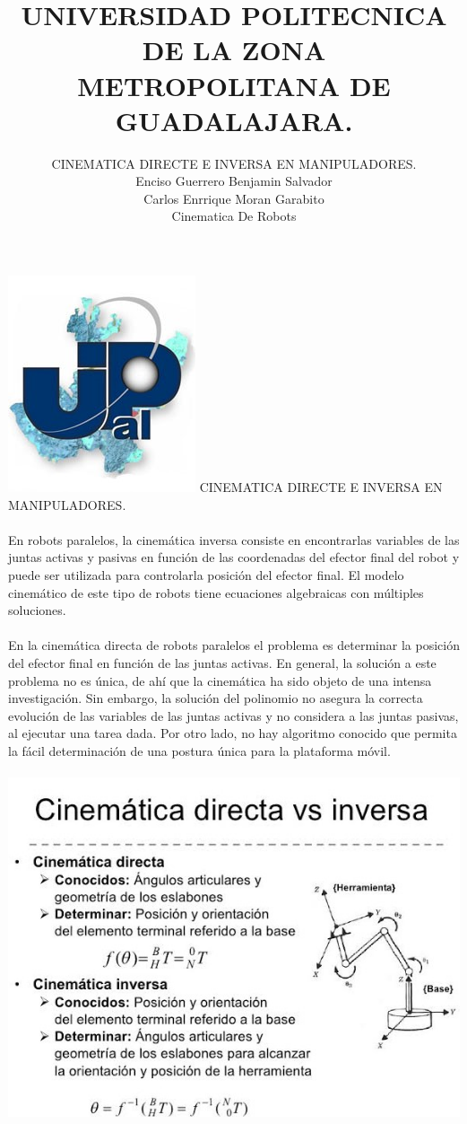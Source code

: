 \documentclass[12pt,a4paper]{article}
\author{CINEMATICA DIRECTE E INVERSA EN MANIPULADORES.\\Enciso Guerrero Benjamin Salvador\\
Carlos Enrrique Moran Garabito\\
Cinematica De Robots }
\title{UNIVERSIDAD POLITECNICA DE LA ZONA METROPOLITANA DE GUADALAJARA.}
\begin{document}
\maketitle
\includegraphics[scale=1.8]{upzmgg.jpg} 
\newpage
CINEMATICA DIRECTE E INVERSA EN MANIPULADORES.
\\\\
En robots paralelos, la cinemática inversa consiste en encontrarlas variables de las juntas activas y pasivas en función de las coordenadas del efector final del robot y puede ser utilizada para controlarla posición del efector final. El modelo cinemático de este tipo de robots tiene ecuaciones algebraicas con múltiples soluciones.
\\\\
En la cinemática directa de robots paralelos el problema es determinar la posición del efector final en función de las juntas activas. En general, la solución a este problema no es única, de ahí que la cinemática ha sido objeto de una intensa investigación. Sin embargo, la solución del polinomio no asegura la correcta evolución de las variables de las juntas activas y no considera a las juntas pasivas, al ejecutar una tarea dada. Por otro lado, no hay algoritmo conocido que permita la fácil determinación de una postura única para la plataforma móvil.
\\\\
 \includegraphics[scale=1]{CINE.jpg} 
\end{document}
